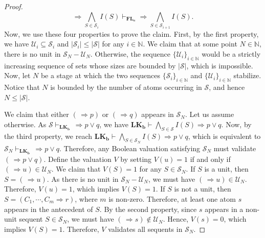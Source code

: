 \documentclass[12pt,a4paper]{article}
\theoremstyle{plain}
\theoremstyle{definition}
\newcommand{\LKb}{\mathbf{LK_b}}
\begin{document}
\begin{proof}
\[
\Rightarrow\bigwedge_{S\in\mathcal{S}_i} I(S)
\vdash_{\mathbf{FL_e}}
\Rightarrow\bigwedge_{S\in\mathcal{S}_{i+1}} I(S).
\]
Now, we use these four properties to prove the claim. First, by the first
property, we have $\mathcal{U}_i\subseteq\mathcal{S}_i$ and
$|\mathcal{S}_i|\leq|\mathcal{S}|$ for any $i\in\mathbb{N}$. We claim that
at some point $N\in\mathbb{N}$, there is no unit in
$\mathcal{S}_N-\mathcal{U}_N$. Otherwise, the sequence
$\{\mathcal{U}_i\}_{i\in\mathbb{N}}$ would be a strictly increasing
sequence of sets whose sizes are bounded by $|\mathcal{S}|$, which is
impossible. Now, let $N$ be a stage at which the two sequences
$\{\mathcal{S}_i\}_{i\in\mathbb{N}}$ and
$\{\mathcal{U}_i\}_{i\in\mathbb{N}}$ stabilize. Notice that $N$ is bounded
by the number of atoms occurring in $\mathcal{S}$, and hence
$N\leq|\mathcal{S}|$.

We claim that either $(\, \Rightarrow p)$ or $(\, \Rightarrow q)$ appears in $\mathcal{S}_N$. Let us assume otherwise. As $\mathcal{S} \vdash_{\LKb} \, \Rightarrow p \vee q$, we have $\LKb \vdash \bigwedge_{S \in \mathcal{S}} I(S) \Rightarrow p \vee q$. Now, by the third property, we reach $\LKb \vdash \bigwedge_{S \in \mathcal{S}_N} I(S) \Rightarrow p \vee q$, which is equivalent to $\mathcal{S}_N \vdash_{\LKb} \, \Rightarrow p \vee q$. Therefore, any Boolean valuation satisfying $\mathcal{S}_N$ must validate $(\, \Rightarrow p \vee q)$.
Define the valuation $V$ by setting $V(u)=1$ if and only if $(\, \Rightarrow u) \in \mathcal{U}_N$. We claim that $V(S)=1$ for any $S \in \mathcal{S}_N$. If $S$ is a unit, then $S=(\, \Rightarrow u)$. As there is no unit in $\mathcal{S}_N-\mathcal{U}_N$, we must have $(\, \Rightarrow u) \in \mathcal{U}_N$. Therefore, $V(u)=1$, which implies $V(S)=1$. If $S$ is not a unit, then $S=(C_1, \cdots, C_m \Rightarrow r)$, where $m$ is non-zero. Therefore, at least one atom $s$ appears in the antecedent of $S$. By the second property, since $s$ appears in a non-unit sequent $S \in \mathcal{S}_N$, we must have $(\, \Rightarrow s) \notin \mathcal{U}_N$. Hence, $V(s)=0$, which implies $V(S)=1$. Therefore, $V$ validates all sequents in $\mathcal{S}_N$.


\end{proof}
\end{document}
